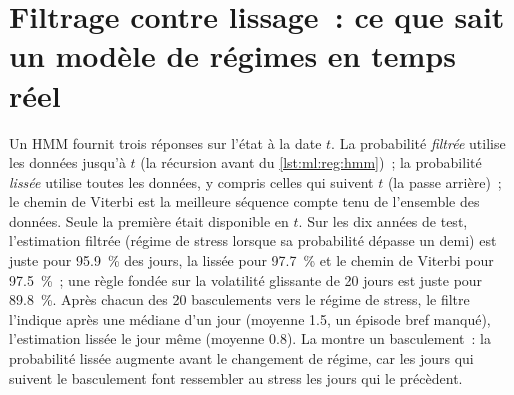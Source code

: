 \section{Filtrage contre lissage~: ce que sait un modèle de régimes en temps réel}

Un HMM fournit trois réponses sur l'état à la date $t$. La probabilité \emph{filtrée} utilise les données jusqu'à $t$ (la récursion avant
du \cref{lst:ml:reg:hmm})~; la probabilité \emph{lissée} utilise toutes les données, y compris celles qui suivent $t$ (la
passe arrière)~; le chemin de Viterbi est la meilleure séquence compte tenu de l'ensemble des données. Seule la première était disponible en $t$. Sur les dix années de test,
l'estimation filtrée (régime de stress lorsque sa probabilité dépasse un demi) est juste pour 95.9~\% des jours, la lissée pour 97.7~\% et le
chemin de Viterbi pour 97.5~\%~; une règle fondée sur la volatilité glissante de 20 jours est juste pour 89.8~\%. Après chacun des 20 basculements vers le
régime de stress, le filtre l'indique après une médiane d'un jour (moyenne 1.5, un épisode bref manqué), l'estimation lissée le jour même
(moyenne 0.8). La  montre un basculement~: la probabilité lissée augmente avant le changement de régime, car les
jours qui suivent le basculement font ressembler au stress les jours qui le précèdent.

\begin{omfigure}

\label{fig:ml:reg:switch}
\end{omfigure}

